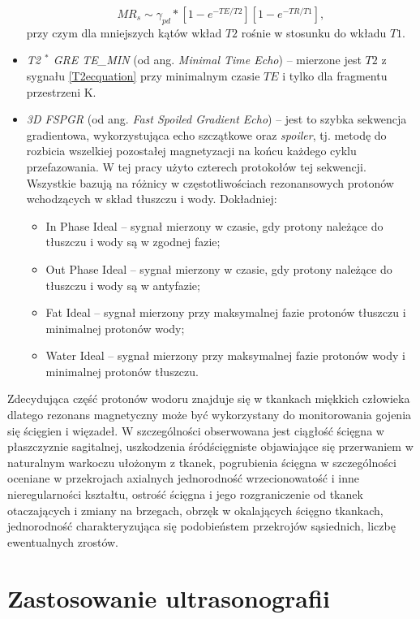\begin{itemize}
\begin{equation}
	MR_s \sim \gamma_{pd} \ast [1-e^{-TE/T2}][1-e^{-TR/T1}],
	\end{equation}
	przy czym dla mniejszych kątów wkład $T2$ rośnie w stosunku do wkładu $T1$.
	\item \textit{T2 $^\ast$ GRE TE\_MIN} (od ang. \textit{Minimal Time Echo}) -- mierzone jest $T2$ z sygnału \ref{T2ecquation} przy minimalnym czasie $TE$ i tylko dla fragmentu przestrzeni K. 
	\item \textit{3D FSPGR} (od ang. \textit{Fast Spoiled Gradient Echo}) -- jest to szybka sekwencja gradientowa, wykorzystująca echo szczątkowe oraz \textit{spoiler}, tj. metodę do rozbicia wszelkiej pozostałej magnetyzacji na końcu każdego cyklu przefazowania. W tej pracy użyto czterech protokołów tej sekwencji. Wszystkie bazują na różnicy w częstotliwościach rezonansowych protonów wchodzących w skład tłuszczu i wody. Dokładniej:
	\begin{itemize}
		\item In Phase Ideal -- sygnał mierzony w czasie, gdy protony należące do tłuszczu i wody są w zgodnej fazie;
		\item Out Phase Ideal -- sygnał mierzony w czasie, gdy protony należące do tłuszczu i wody są w antyfazie;
		\item Fat Ideal -- sygnał mierzony przy maksymalnej fazie protonów tłuszczu i minimalnej protonów wody;
		\item Water Ideal -- sygnał mierzony przy maksymalnej fazie protonów wody i minimalnej protonów tłuszczu.
	\end{itemize}
\end{itemize}

Zdecydująca część protonów wodoru znajduje się w tkankach miękkich człowieka dlatego rezonans magnetyczny może być wykorzystany do monitorowania gojenia się ścięgien i więzadeł. W szczególności obserwowana jest ciągłość ścięgna w płaszczyznie sagitalnej, uszkodzenia śródścięgniste objawiające się przerwaniem w naturalnym warkoczu ułożonym z tkanek, pogrubienia ścięgna w szczególności oceniane w przekrojach axialnych jednorodność wrzecionowatość i inne nieregularności kształtu, ostrość ścięgna i jego rozgraniczenie od tkanek otaczających i zmiany na brzegach, obrzęk w okalających ścięgno tkankach, jednorodność charakteryzująca się podobieństem przekrojów sąsiednich, liczbę ewentualnych zrostów.

\section{Zastosowanie ultrasonografii}

